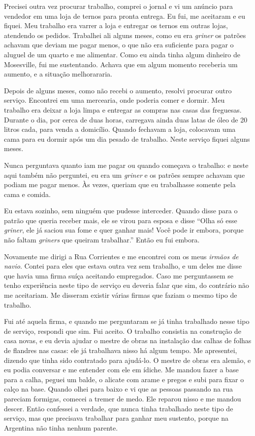Precisei outra vez procurar trabalho, comprei o jornal e vi um anúncio para vendedor em uma loja de ternos para pronta entrega. Eu fui, me aceitaram e eu fiquei. Meu trabalho era varrer a loja e
entregar os ternos em outras lojas, atendendo os pedidos.
Trabalhei ali alguns meses, como eu era \textit{griner} os patrões achavam
que deviam me pagar menos, o que não era suficiente para pagar o aluguel
de um quarto e me alimentar. Como eu ainda tinha algum dinheiro de
Mosesville, fui me sustentando. Achava que em algum momento receberia um aumento, e
a situação melhorararia.

Depois de alguns meses, como não recebi o aumento, resolvi procurar
outro serviço. Encontrei em uma mercearia, onde poderia comer e dormir. Meu trabalho era deixar a loja limpa e entregar as compras nas
casas das freguesas. Durante o dia, por cerca de duas horas, carregava ainda duas
latas de óleo de 20 litros cada, para venda a domicílio. Quando
fechavam a loja, colocavam uma cama para eu dormir após um dia pesado
de trabalho. Neste serviço fiquei alguns meses. 

Nunca perguntava
quanto iam me pagar ou quando começava o trabalho: e neste aqui também não
perguntei, eu era um \textit{griner} e os patrões sempre achavam que
podiam me pagar menos. Às vezes, queriam que eu trabalhasse somente
pela cama e comida.

Eu estava sozinho, sem ninguém que pudesse interceder. Quando disse
para o patrão que queria receber mais, ele se virou para esposa e
disse ``Olha só esse \textit{griner}, ele já saciou sua fome e quer
ganhar mais! Você pode ir embora, porque não faltam \textit{griners} que
queiram trabalhar.'' Então eu fui embora.

Novamente me dirigi a Rua Corrientes e me encontrei com os meus \textit{irmãos
de navio}. Contei para eles que estava outra vez sem trabalho, e um
deles me disse que havia uma firma suíça aceitando empregados. 
Caso me perguntassem se tenho experiência neste
tipo de serviço eu deveria falar que sim, do contrário não me
aceitariam. Me disseram existir várias firmas que faziam o mesmo
tipo de trabalho.

Fui até aquela firma, e quando me perguntaram se já tinha
trabalhado nesse tipo de serviço, respondi que sim. Fui aceito. O
trabalho consistia na construção de casa novas, e eu devia ajudar o mestre
de obras na instalação das calhas de folhas de flandres nas casas: ele já trabalhava nisso há algum tempo. 
Me apresentei, dizendo
que tinha sido contratado para ajudá-lo. O mestre de obras era alemão, e eu
podia conversar e me entender com ele em ídiche. Me mandou fazer a base
para a calha, peguei um balde, o alicate com arame e pregos e subi para
fixar o calço na base. Quando olhei para baixo e vi que as pessoas
passando na rua pareciam formigas, comecei a tremer de medo. Ele
reparou nisso e me mandou descer. Então confessei a verdade, que
nunca tinha trabalhado neste tipo de serviço, mas que precisava
trabalhar para ganhar meu sustento, porque na Argentina não
tinha nenhum parente.

